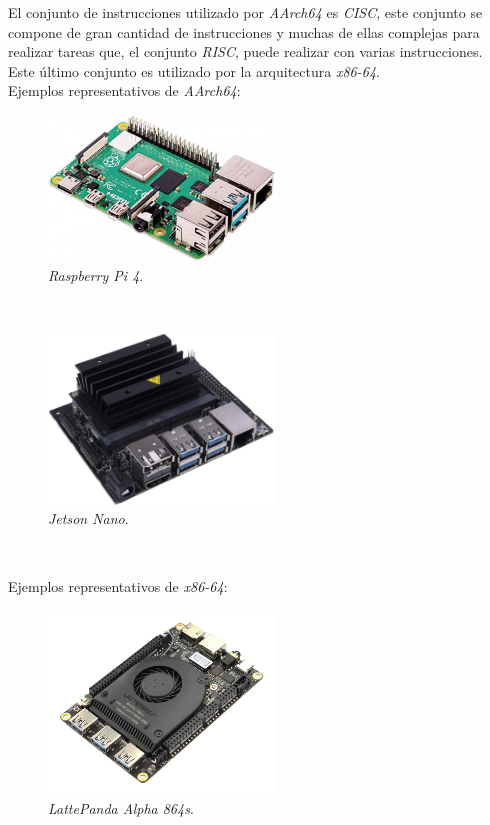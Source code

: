 El conjunto de instrucciones utilizado por \textit{AArch64} es \textit{CISC}, este conjunto se compone de gran cantidad de instrucciones y muchas de ellas complejas para realizar tareas que, el conjunto \textit{RISC}, puede realizar con varias instrucciones. Este último conjunto es utilizado por la arquitectura \textit{x86-64}.\\

Ejemplos representativos de \textit{AArch64}:
\begin{figure} [h!]
	\begin{center}
		\includegraphics[width=6cm]{figs/raspberrypi}
	\end{center}
	\caption{\textit{Raspberry Pi 4}.}
	\label{fig:raspberrypi}
\end{figure}\

\begin{figure} [h!]
	\begin{center}
		\includegraphics[width=6cm]{figs/jetson_nano}
	\end{center}
	\caption{\textit{Jetson Nano}.}
	\label{fig:jetsonnano}
\end{figure}\

Ejemplos representativos de \textit{x86-64}:

\begin{figure} [h!]
	\begin{center}
		\includegraphics[width=6cm]{figs/lattepanda}
	\end{center}
	\caption{\textit{LattePanda Alpha 864s}.}
	\label{fig:lattepanda}
\end{figure}\

